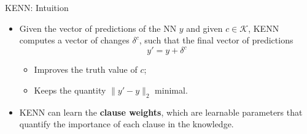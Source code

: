 \documentclass{beamer}
\begin{document}
\begin{frame}{KENN: Intuition}
	\begin{itemize}
		\item Given the vector of predictions of the NN $y$ and given $c\in \mathcal{K}$, KENN computes a vector of changes $\delta^c$, such that the final vector of predictions $$y' = y +\delta^c$$
		\begin{itemize}
			\item Improves the truth value of $c$;
			\item Keeps the quantity $\|y'-y \|_2$ minimal.
			\pause
		\end{itemize}
	
	\item KENN can learn the \textbf{clause weights}, which are learnable parameters that quantify the importance of each clause in the knowledge.
	\end{itemize}
	
	
\end{frame}



\end{document}

